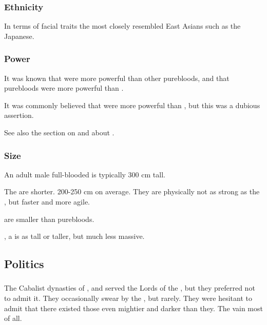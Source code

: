\subsubsection{Ethnicity}
In terms of facial traits the \resphain{} most closely resembled East Asians such as the Japanese. 





\subsubsection{Power}
It was known that \satharioth were more powerful than other purebloods, and that purebloods were more powerful than \bezedeth. 

It was commonly believed that \ketherain were more powerful than \thelyadeth, but this was a dubious assertion.


See also the section on  and about .






\subsubsection{Size}
An adult male full-blooded \resphan{} is typically 300 cm tall. 

The \resviel{} are shorter. 
200-250 cm on average. 
They are physically not as strong as the \resphain, but faster and more agile. 

\Bezedeth{} are smaller than purebloods.

, a \resphan is as tall or taller, but much less massive. 








\subsection{Politics}





\subsubsection{\Banes}
The Cabalist dynasties of \KiriathSepher, \TiphredSerah{} and \Mystraacht{} served the Lords of the \SitraAchras, but they preferred not to admit it. 
They occasionally swear by the \banelords, but rarely. 
They were hesitant to admit that there existed those even mightier and darker than they. 
The vain \KiriathSepher{} most of all.

